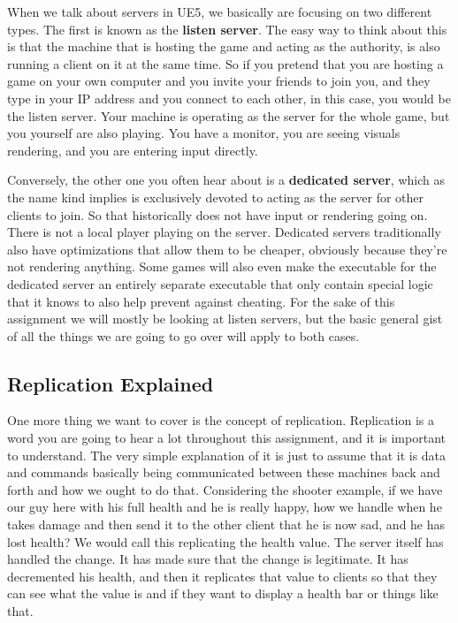 \documentclass[
  letterpaper,
  DIV=11,
  numbers=noendperiod]{scrartcl}
\begin{document}
When we talk about servers in UE5, we basically are focusing on two
different types. The first is known as the \textbf{listen server}. The
easy way to think about this is that the machine that is hosting the
game and acting as the authority, is also running a client on it at the
same time. So if you pretend that you are hosting a game on your own
computer and you invite your friends to join you, and they type in your
IP address and you connect to each other, in this case, you would be the
listen server. Your machine is operating as the server for the whole
game, but you yourself are also playing. You have a monitor, you are
seeing visuals rendering, and you are entering input directly.

Conversely, the other one you often hear about is a \textbf{dedicated
server}, which as the name kind implies is exclusively devoted to acting
as the server for other clients to join. So that historically does not
have input or rendering going on. There is not a local player playing on
the server. Dedicated servers traditionally also have optimizations that
allow them to be cheaper, obviously because they're not rendering
anything. Some games will also even make the executable for the
dedicated server an entirely separate executable that only contain
special logic that it knows to also help prevent against cheating. For
the sake of this assignment we will mostly be looking at listen servers,
but the basic general gist of all the things we are going to go over
will apply to both cases.

\subsection{Replication Explained}\label{replication-explained}

One more thing we want to cover is the concept of replication.
Replication is a word you are going to hear a lot throughout this
assignment, and it is important to understand. The very simple
explanation of it is just to assume that it is data and commands
basically being communicated between these machines back and forth and
how we ought to do that. Considering the shooter example, if we have our
guy here with his full health and he is really happy, how we handle when
he takes damage and then send it to the other client that he is now sad,
and he has lost health? We would call this replicating the health value.
The server itself has handled the change. It has made sure that the
change is legitimate. It has decremented his health, and then it
replicates that value to clients so that they can see what the value is
and if they want to display a health bar or things like that.
\end{document}
